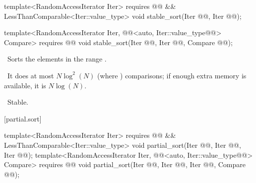 \documentclass[american,twoside]{book}
\begin{document}
\begin{paras}
%
\color{addclr}\begin{itemdecl}
template<RandomAccessIterator Iter>
  requires @@ &&
           LessThanComparable<Iter::value_type> 
  void stable_sort(Iter @@, Iter @@);

template<RandomAccessIterator Iter, 
         @@<auto, Iter::value_type@@> Compare>
  requires @@
  void stable_sort(Iter @@, Iter @@,
                   Compare @@);
\end{itemdecl}\color{black}

\begin{itemdescr}
\pnum
\effects\ 
Sorts the elements in the range .

\pnum
{}

\pnum
\complexity\ 
It does at most $N \log^2(N)$
(where
)
comparisons; if enough extra memory is available, it is
$N \log(N)$.

\pnum
\notes\ 
Stable.
\end{itemdescr}

[partial.sort]{}

%
\color{addclr}\begin{itemdecl}
template<RandomAccessIterator Iter>
  requires @@ && 
           LessThanComparable<Iter::value_type>
  void partial_sort(Iter @@,
                    Iter @\farg{middle}@,
                    Iter @\farg{last}@);
template<RandomAccessIterator Iter, 
         @@<auto, Iter::value_type@@> Compare>
  requires @@
  void partial_sort(Iter @@,
                    Iter @\farg{middle}@,
                    Iter @\farg{last}@,
                    Compare @\farg{comp}@);
\end{itemdecl}\color{black}


\end{paras}
\end{document}
